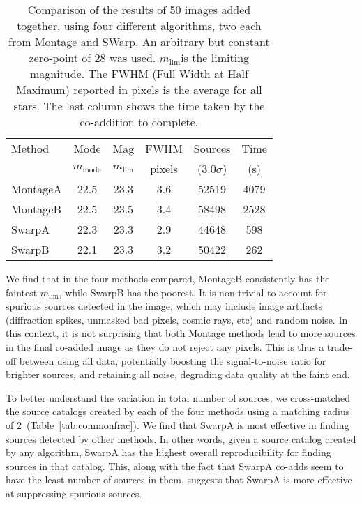 \documentclass[fleqn,usenatbib]{mnras}
\newcommand{\mmode}{\ensuremath{m_\mathrm{mode}}}
\newcommand{\mlim}{\ensuremath{m_\mathrm{lim}}}
\begin{document}
\begin {table}
\begin{center}
\begin{tabular}{lccccc}
\hline
Method&  Mode  &  Mag  &  FWHM  &  Sources & Time\\
& \mmode & \mlim & pixels & ($3.0\sigma$) & (s)\\
\hline
MontageA & 22.5 & 23.3  & 3.6& 52519 &4079\\
MontageB & 22.5 & 23.5 & 3.4& 58498 &2528\\
SwarpA & 22.3 & 23.3 &2.9& 44648 &598\\
SwarpB & 22.1 & 23.3 &3.2& 50422 &262\\
\hline
\end{tabular}
\caption{\label{tab:sextr} Comparison of the results of 50 images added together, using four different algorithms, two each from Montage and SWarp. An arbitrary but constant zero-point of 28 was used. \mlim is the limiting magnitude. The FWHM (Full Width at Half Maximum) reported in pixels is the average for all stars. The last column shows the time taken by the co-addition to complete. 
} 
\end{center}
\end {table}

We find that in the four methods compared, MontageB consistently has the faintest \mlim, while SwarpB has the poorest. It is non-trivial to account for spurious sources detected in the image, which may include image artifacts (diffraction spikes, unmasked bad pixels, cosmic rays, etc) and random noise. In this context, it is not surprising that both Montage methods lead to more sources in the final co-added image as they do not reject any pixels. This is thus a trade-off between using all data, potentially boosting the signal-to-noise ratio for brighter sources, and retaining all noise, degrading data quality at the faint end. 

To better understand the variation in total number of sources, we cross-matched the source catalogs created by each of the four methods using a matching radius of 2\arcsec\ (Table~\ref{tab:commonfrac}). We find that SwarpA is most effective in finding sources detected by other methods. In other words, given a source catalog created by any algorithm, SwarpA has the highest overall reproducibility for finding sources in that catalog. This, along with the fact that SwarpA co-adds seem to have the least number of sources in them, suggests that SwarpA is more effective at suppressing spurious sources.
\end{document}
